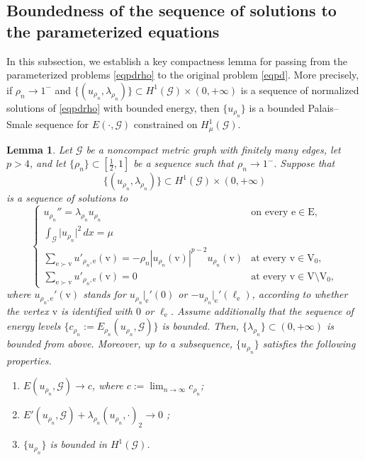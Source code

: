 \documentclass[11pt]{amsart}
\newtheorem{lemma}[theorem]{Lemma}
\newcommand{\abs}[1]{\lvert#1\rvert}
\newcommand{\G}{\mathcal{G}}
\newcommand{\E}{\mathrm{E}}
\newcommand{\V}{\mathrm{V}}
\newcommand{\e}{\mathrm{e}}
\newcommand{\vv}{\mathrm{v}}
\numberwithin{equation}{section}
\begin{document}
\fi

\subsection{Boundedness of the sequence of solutions to the parameterized equations}
In this subsection, we establish a key compactness lemma for passing from the parameterized problems \eqref{eqpdrho} to the original problem \eqref{eqpd}. More precisely, if $\rho_n\to1^-$ and $\{(u_{\rho_n},\lambda_{\rho_n})\}\subset H^1(\G)\times(0,+\infty)$ is a sequence of normalized solutions of \eqref{eqpdrho} with bounded energy, then $\{u_{\rho_n}\}$ is a bounded Palais--Smale sequence for $E(\cdot,\G)$ constrained on $H^1_\mu(\G)$.
\begin{lemma}\label{lembu}
Let $\G$ be a noncompact metric graph with finitely many edges, let $p > 4$, and let $ \{\rho_n\} \subset [\frac{1}{2}, 1] $ be a sequence such that $\rho_n\rightarrow 1^{-}$. Suppose that 
$$\{(u_{\rho_n},\lambda_{\rho_n})\} \subset H^1(\G)\times (0,+\infty)$$
is a sequence of solutions  to 
\begin{equation}\label{eqpdn}
    \begin{cases} 
u_{\rho_n}'' = \lambda_{\rho_n} u_{\rho_n} & \text{on every }\e \in \E, \\ 
\int_\G\abs{u_{\rho_n}}^2\, dx = \mu & \\
\displaystyle\sum_{\e \succ \vv} u'_{\rho_n,\e}(\vv) = -\rho_n|u_{\rho_n}(\vv)|^{p-2}u_{\rho_n}(\vv) & \text{at every } \vv \in \V_0,\\
 \displaystyle\sum_{\e \succ \vv} u'_{\rho_n,\e}(\vv) = 0 & \text{at every } \vv \in \V \setminus \V_0,
\end{cases}
\end{equation}
where $u_{\rho_n,\e}'(\vv)$ stands for $u_{\rho_n}|_\e'(0)$ or $-u_{\rho_n}|_\e'(\ell_\e)$, according to whether the vertex $\vv$ is identified with $0$ or $\ell_\e$. Assume additionally  that the sequence of energy levels $\{c_{\rho_n} := E_{{\rho_n}}(u_{\rho_n}, \G)\}$ is bounded. Then, $\{\lambda_{\rho_n}\} \subset (0,+\infty)$ is bounded from above. Moreover, up to a subsequence, $\{u_{\rho_n}\}$ satisfies the following properties.
	\begin{enumerate}[label=\rm(\roman*)]
		\item $E(u_{\rho_n},\G) \to c$, where  $\displaystyle c:= \lim_{n \to \infty}c_{\rho_n}$;\label{bps1}
		\item $E'(u_{\rho_n},\G)+\lambda_{\rho_n}(u_{\rho_n},\cdot)_2 \to 0 $ ;
		\item $\{u_{\rho_n}\}$ is bounded in $ H^1(\G) $.\label{bps3}
	\end{enumerate}
\end{lemma}
\end{document}

